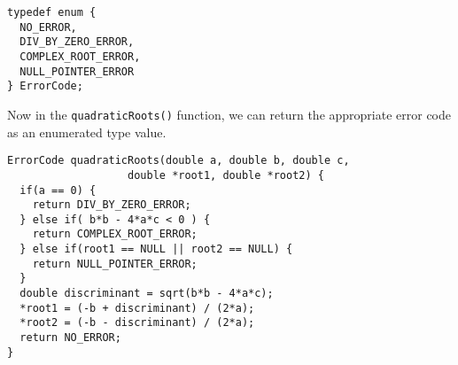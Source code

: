 \begin{verbatim}
typedef enum {
  NO_ERROR,
  DIV_BY_ZERO_ERROR,
  COMPLEX_ROOT_ERROR,
  NULL_POINTER_ERROR
} ErrorCode;
\end{verbatim}

Now in the \texttt{quadraticRoots()} function, we can
return the appropriate error code as an enumerated type value.

\begin{verbatim}
ErrorCode quadraticRoots(double a, double b, double c, 
                   double *root1, double *root2) {
  if(a == 0) {
    return DIV_BY_ZERO_ERROR;
  } else if( b*b - 4*a*c < 0 ) {
    return COMPLEX_ROOT_ERROR;
  } else if(root1 == NULL || root2 == NULL) {
    return NULL_POINTER_ERROR;
  }
  double discriminant = sqrt(b*b - 4*a*c);
  *root1 = (-b + discriminant) / (2*a);
  *root2 = (-b - discriminant) / (2*a);
  return NO_ERROR;
}
\end{verbatim}

